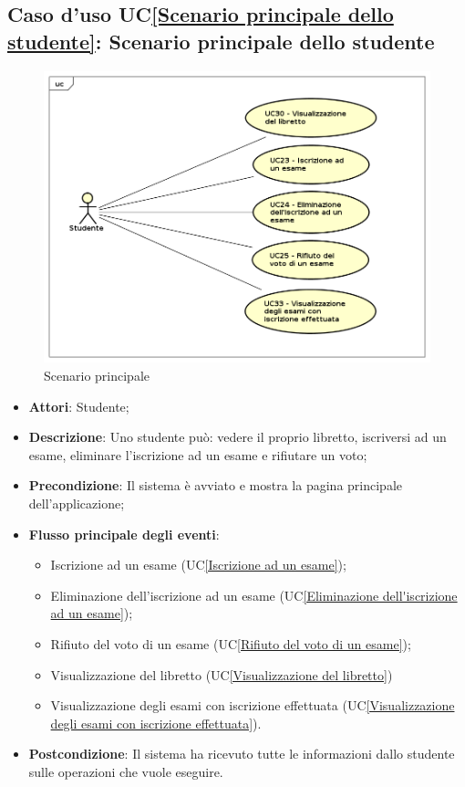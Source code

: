 \subsection{Caso d'uso UC\ref{Scenario principale dello studente}: Scenario principale dello studente}
\begin{figure} [H]
	\centering
	\includegraphics[scale=0.4]{./img/UseCaseDiagram04.png}
	\caption{Scenario principale }\label{}
\end{figure}
\begin{itemize}
	\item \textbf{Attori}: Studente;
	\item \textbf{Descrizione}: Uno studente può: vedere il proprio libretto, iscriversi ad un esame, eliminare l'iscrizione ad un esame e rifiutare un voto;
	\item \textbf{Precondizione}: Il sistema è avviato e mostra la pagina principale dell'applicazione;
	\item \textbf{Flusso principale degli eventi}: 
	\begin{itemize}
		\item Iscrizione ad un esame
		(UC\ref{Iscrizione ad un esame});
		\item Eliminazione dell’iscrizione ad un esame
		(UC\ref{Eliminazione dell'iscrizione ad un esame});
		\item Rifiuto del voto di un esame 
		(UC\ref{Rifiuto del voto di un esame});
		\item Visualizzazione del libretto
		(UC\ref{Visualizzazione del libretto})
		\item Visualizzazione degli esami con iscrizione effettuata
		(UC\ref{Visualizzazione degli esami con iscrizione effettuata}).
	\end{itemize}
	\item \textbf{Postcondizione}: Il sistema ha ricevuto tutte le informazioni dallo studente sulle operazioni che vuole eseguire.
\end{itemize}

